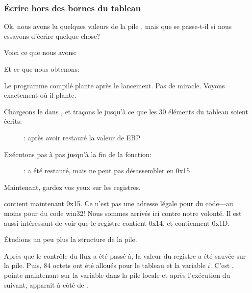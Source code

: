 \subsubsection{Écrire hors des bornes du tableau}

Ok, nous avons lu quelques valeurs de la pile , mais que se passe-t-il
si nous essayons d'écrire quelque chose?

Voici ce que nous avons:




Et ce que nous obtenons:



Le programme compilé plante après le lancement. Pas de miracle. Voyons exactement
où il plante.

\clearpage
\myindex{\olly}

Chargeons le dans \olly, et traçons le jusqu'à ce que les 30 éléments du tableau
soient écrits:

\begin{figure}[H]
\centering
{}
\caption{\olly: après avoir restauré la valeur de EBP}
\label{fig:array_BO_olly_w1}
\end{figure}

\clearpage
Exécutons pas à pas jusqu'à la fin de la fonction:

\begin{figure}[H]
\centering
{}
\caption{\olly: 
 a été restauré, mais \olly ne peut pas désassembler en 0x15}
\label{fig:array_BO_olly_w2}
\end{figure}

Maintenant, gardez vos yeux sur les registres.

\EIP contient maintenant 0x15. Ce n'est pas une adresse légale pour du code---au
moins pour du code win32!
Nous sommes arrivés ici contre notre volonté.
Il est aussi intéressant de voir que le registre \EBP contient 0x14, \ECX et \EDX
contiennent 0x1D.

Étudions un peu plus la structure de la pile.

Après que le contrôle du flux a été passé à\TT{\main}, la valeur du registre \EBP
a été sauvée sur la pile.
Puis, 84 octets ont été alloués pour le tableau et la variable $i$.
C'est .
\ESP pointe maintenant sur la variable  dans la pile locale et après l'exécution
du  suivant,  apparait à côté de .

